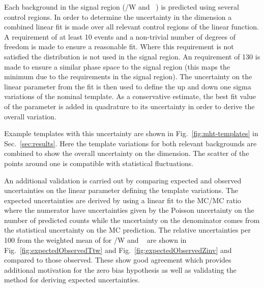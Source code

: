 Each background in the signal region (\ttbar/W  and \zInv~) is predicted 
using several control regions. In order to determine the uncertainty in
the \mht dimension a combined linear fit is made over all relevant control regions
of the linear function. A requirement of at least 10 events and a non-trivial
number of degrees of freedom is made to ensure a reasonable fit. Where this
requirement is not satisfied the \mht distribution is not used in the signal region.
An \mht requirement of 130 \GeV is made to ensure a similar phase space to 
the signal region (this maps the minimum \mht due to the \alt requirements in the signal region).
The uncertainty on the linear parameter from the fit is then
used to define the up and down one sigma variations of the nominal template.
As a conservative estimate, the best fit value of the parameter is 
added in quadrature to its uncertainty in order to derive the overall variation.

Example templates with this uncertainty are shown in Fig.~\ref{fig:mht-templates}
in Sec.~\ref{sec:results}. Here the template variations for both relevant 
backgrounds are combined to show the overall uncertainty on the \mht dimension. 
The scatter of the points around one is compatible with statistical fluctuations.

An additional validation is carried out by comparing expected and observed uncertainties
on the linear parameter defining the template variations.
The expected uncertainties are derived by using a linear fit to the MC/MC ratio where the numerator
have uncertainties given by the Poisson uncertainty on the number of predicted counts while
the uncertainty on the denominator comes from the statistical uncertainty on the
MC prediction. The relative uncertainties per 100 \GeV from the weighted mean of \mht
for \ttbar/W and \zInv~ are shown in Fig.~\ref{fig:expectedObservedTtw} 
and Fig.~\ref{fig:expectedObservedZinv} and compared to those observed.
These show good agreement which provides additional motivation for the 
zero bias hypothesis as well as validating the method for deriving expected uncertainties.


